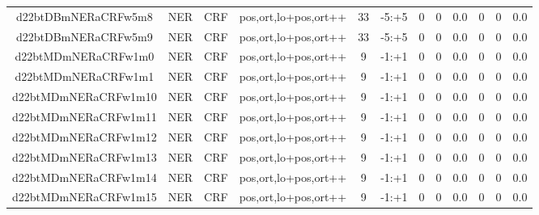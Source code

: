 \documentclass[a4paper]{article}
\begin{document}
\begin{landscape}
\begin{center}
\begin{tabular}{ |c|c|c|c|c|c|c|c|c|c|c|c|}
 
 	
 	\small{ d22btDBmNERaCRFw5m8 } & \small{ NER} & \small{  CRF }  & pos,ort,lo+pos,ort++  &  33 &  \small{  -5:+5 }  &  0 & 0 & 0.0  &  0 & 0 & 0.0 \\
 	

 
 	
 	\small{ d22btDBmNERaCRFw5m9 } & \small{ NER} & \small{  CRF }  & pos,ort,lo+pos,ort++  &  33 &  \small{  -5:+5 }  &  0 & 0 & 0.0  &  0 & 0 & 0.0 \\
 	

 
 	
 	\small{ d22btMDmNERaCRFw1m0 } & \small{ NER} & \small{  CRF }  & pos,ort,lo+pos,ort++  &  9 &  \small{  -1:+1 }  &  0 & 0 & 0.0  &  0 & 0 & 0.0 \\
 	

 
 	
 	\small{ d22btMDmNERaCRFw1m1 } & \small{ NER} & \small{  CRF }  & pos,ort,lo+pos,ort++  &  9 &  \small{  -1:+1 }  &  0 & 0 & 0.0  &  0 & 0 & 0.0 \\
 	

 
 	
 	\small{ d22btMDmNERaCRFw1m10 } & \small{ NER} & \small{  CRF }  & pos,ort,lo+pos,ort++  &  9 &  \small{  -1:+1 }  &  0 & 0 & 0.0  &  0 & 0 & 0.0 \\
 	

 
 	
 	\small{ d22btMDmNERaCRFw1m11 } & \small{ NER} & \small{  CRF }  & pos,ort,lo+pos,ort++  &  9 &  \small{  -1:+1 }  &  0 & 0 & 0.0  &  0 & 0 & 0.0 \\
 	

 
 	
 	\small{ d22btMDmNERaCRFw1m12 } & \small{ NER} & \small{  CRF }  & pos,ort,lo+pos,ort++  &  9 &  \small{  -1:+1 }  &  0 & 0 & 0.0  &  0 & 0 & 0.0 \\
 	

 
 	
 	\small{ d22btMDmNERaCRFw1m13 } & \small{ NER} & \small{  CRF }  & pos,ort,lo+pos,ort++  &  9 &  \small{  -1:+1 }  &  0 & 0 & 0.0  &  0 & 0 & 0.0 \\
 	

 
 	
 	\small{ d22btMDmNERaCRFw1m14 } & \small{ NER} & \small{  CRF }  & pos,ort,lo+pos,ort++  &  9 &  \small{  -1:+1 }  &  0 & 0 & 0.0  &  0 & 0 & 0.0 \\
 	

 
 	
 	\small{ d22btMDmNERaCRFw1m15 } & \small{ NER} & \small{  CRF }  & pos,ort,lo+pos,ort++  &  9 &  \small{  -1:+1 }  &  0 & 0 & 0.0  &  0 & 0 & 0.0 \\
 	


\end{tabular}
\end{center}
\end{landscape}
\end{document}
